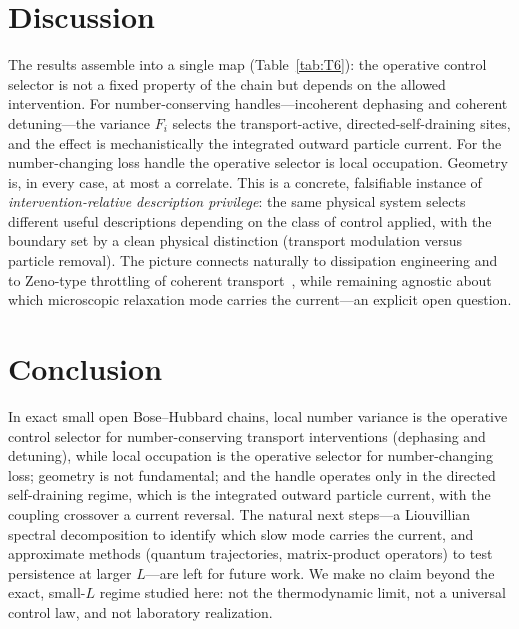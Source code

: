 \documentclass[aps,pra,reprint,amsmath,amssymb,longbibliography,floatfix]{revtex4-2}
\newcommand{\Fi}{F_i}
\begin{document}
\section{Discussion}
The results assemble into a single map (Table~\ref{tab:T6}): the operative control selector is not
a fixed property of the chain but depends on the allowed intervention. For number-conserving
handles---incoherent dephasing and coherent detuning---the variance $\Fi$ selects the
transport-active, directed-self-draining sites, and the effect is mechanistically the integrated
outward particle current. For the number-changing loss handle the operative selector is local
occupation. Geometry is, in every case, at most a correlate. This is a concrete, falsifiable
instance of \emph{intervention-relative description privilege}: the same physical system selects
different useful descriptions depending on the class of control applied, with the boundary set by a
clean physical distinction (transport modulation versus particle removal). The picture connects
naturally to dissipation engineering and to Zeno-type throttling of coherent
transport~\cite{diehl2008,daley2014}, while remaining agnostic about which microscopic relaxation
mode carries the current---an explicit open question.

\begin{table}[tbp]
\centering
\caption{The intervention-relative map: operative selector by intervention class.}
\label{tab:T6}

\end{table}

\section{Conclusion}
In exact small open Bose--Hubbard chains, local number variance is the operative control selector
for number-conserving transport interventions (dephasing and detuning), while local occupation is
the operative selector for number-changing loss; geometry is not fundamental; and the handle
operates only in the directed self-draining regime, which is the integrated outward particle
current, with the coupling crossover a current reversal. The natural next steps---a Liouvillian
spectral decomposition to identify which slow mode carries the current, and approximate methods
(quantum trajectories, matrix-product operators) to test persistence at larger $L$---are left for
future work. We make no claim beyond the exact, small-$L$ regime studied here: not the
thermodynamic limit, not a universal control law, and not laboratory realization.
\end{document}
